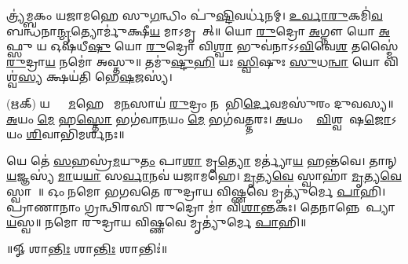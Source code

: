 𑌤𑍍𑌰𑍍𑌯॑𑌮𑍍𑌬𑌕𑌂 𑌯𑌜𑌾𑌮𑌹𑍇 𑌸𑍁\ul{𑌗}𑌨𑍍𑌧𑌿𑌂 𑌪𑍁॑\ul{𑌷𑍍𑌟𑌿}𑌵𑌰𑍍𑌧॑𑌨𑌮𑍍। \ul{𑌉}\ul{𑌰𑍍𑌵𑌾}\ul{𑌰𑍁}𑌕𑌮𑌿॑\ul{𑌵} 𑌬𑌨𑍍𑌧॑𑌨𑌾\ul{𑌨𑍍𑌮𑍃}𑌤𑍍𑌯𑍋𑌰𑍍𑌮𑍁॑𑌕𑍍𑌷𑍀\ul{𑌯} 𑌮𑌾𑌽𑌮𑍃𑌤𑌾᳚𑌤𑍍॥ 𑌯𑍋 \ul{𑌰𑍁}𑌦𑍍𑌰𑍋 \ul{𑌅}𑌗𑍍𑌨𑍗 𑌯𑍋 \ul{𑌅}𑌫𑍍𑌸𑍁 𑌯 𑌓𑌷॑𑌧𑍀\ul{𑌷𑍁} 𑌯𑍋 \ul{𑌰𑍁}𑌦𑍍𑌰𑍋 𑌵𑌿\ul{𑌶𑍍𑌵𑌾} 𑌭𑍁𑌵॑𑌨𑌾𑌽𑌽\ul{𑌵𑌿}𑌵𑍇\ul{𑌶} 𑌤𑌸𑍍𑌮𑍈॑ \ul{𑌰𑍁}𑌦𑍍𑌰𑌾\ul{𑌯} 𑌨𑌮𑍋॑ 𑌅𑌸𑍍𑌤𑍁॥ 𑌤𑌮𑍁॑\ul{𑌷𑍍𑌟𑍁}\ul{𑌹𑌿} 𑌯𑌃 \ul{𑌸𑍍𑌵𑌿}𑌷𑍁𑌃 \ul{𑌸𑍁}𑌧\ul{𑌨𑍍𑌵𑌾} 𑌯𑍋 𑌵𑌿𑌶𑍍𑌵॑\ul{𑌸𑍍𑌯} 𑌕𑍍𑌷𑌯॑𑌤𑌿 𑌭𑍇\ul{𑌷}𑌜𑌸𑍍𑌯॑। 

(𑌋𑌕𑍍)   𑌯𑌕𑍍𑌷𑍍𑌵𑌾᳚\ul{𑌮}𑌹𑍇 𑌸𑍗᳚𑌮\ul{𑌨}𑌸𑌾𑌯॑ \ul{𑌰𑍁}𑌦𑍍𑌰𑌂 𑌨𑌮𑍋᳚𑌭𑌿\ul{𑌰𑍍𑌦𑍇}𑌵𑌮𑌸𑍁॑𑌰𑌂 𑌦𑍁𑌵𑌸𑍍𑌯॥ \ul{𑌅}𑌯𑌂 \ul{𑌮𑍇} 𑌹\ul{𑌸𑍍𑌤𑍋} 𑌭𑌗॑𑌵𑌾\ul{𑌨}𑌯𑌂 \ul{𑌮𑍇} 𑌭𑌗॑𑌵𑌤𑍍𑌤𑌰𑌃। \ul{𑌅}𑌯𑌂 𑌮𑍇᳚ \ul{𑌵𑌿}𑌶𑍍𑌵𑌭𑍇᳚𑌷\ul{𑌜𑍋}𑌽𑌯𑌂 \ul{𑌶𑌿}𑌵𑌾𑌭𑌿॑𑌮𑌰𑍍𑌶𑌨𑌃॥

𑌯𑍇 𑌤𑍇॑ \ul{𑌸}𑌹𑌸𑍍𑌰॑\ul{𑌮}𑌯𑍁\ul{𑌤𑌂} 𑌪𑌾\ul{𑌶𑌾} 𑌮𑍃\ul{𑌤𑍍𑌯𑍋} 𑌮𑌰𑍍𑌤𑍍𑌯𑌾॑\ul{𑌯} 𑌹𑌨𑍍𑌤॑𑌵𑍇। 𑌤𑌾𑌨𑍍 \ul{𑌯}𑌜𑍍𑌞𑌸𑍍𑌯॑ \ul{𑌮𑌾}𑌯\ul{𑌯𑌾} 𑌸\ul{𑌰𑍍𑌵𑌾}𑌨𑌵॑ 𑌯𑌜𑌾𑌮𑌹𑍇। \ul{𑌮𑍃}𑌤𑍍𑌯\ul{𑌵𑍇} 𑌸𑍍𑌵𑌾𑌹𑌾॑ \ul{𑌮𑍃}𑌤𑍍𑌯\ul{𑌵𑍇} 𑌸𑍍𑌵𑌾𑌹𑌾᳚॥ 𑌓𑌂 𑌨𑌮𑍋 𑌭𑌗𑌵𑌤𑍇 𑌰𑍁𑌦𑍍𑌰𑌾𑌯 𑌵𑌿𑌷𑍍𑌣𑌵𑍇 𑌮𑍃𑌤𑍍𑌯𑍁॑𑌰𑍍𑌮𑍇 \ul{𑌪𑌾}𑌹𑌿। 𑌪𑍍𑌰𑌾𑌣𑌾𑌨𑌾𑌂 𑌗𑍍𑌰𑌨𑍍𑌥𑌿𑌰𑌸𑌿 𑌰𑍁𑌦𑍍𑌰𑍋 𑌮𑌾॑ 𑌵𑌿\ul{𑌶𑌾}𑌨𑍍𑌤𑌕𑌃। 𑌤𑍇𑌨𑌾𑌨𑍍𑌨𑍇𑌨𑌾᳚𑌪𑍍𑌯𑌾\ul{𑌯}𑌸𑍍𑌵॥ 𑌨𑌮𑍋 𑌰𑍁𑌦𑍍𑌰𑌾𑌯 𑌵𑌿𑌷𑍍𑌣𑌵𑍇 𑌮𑍃𑌤𑍍𑌯𑍁॑𑌰𑍍𑌮𑍇 \ul{𑌪𑌾}𑌹𑌿॥
 
\centerline{॥𑍐 𑌶𑌾\ul{𑌨𑍍𑌤𑌿𑌃} 𑌶𑌾\ul{𑌨𑍍𑌤𑌿𑌃} 𑌶𑌾𑌨𑍍𑌤𑌿𑌃॑॥}


